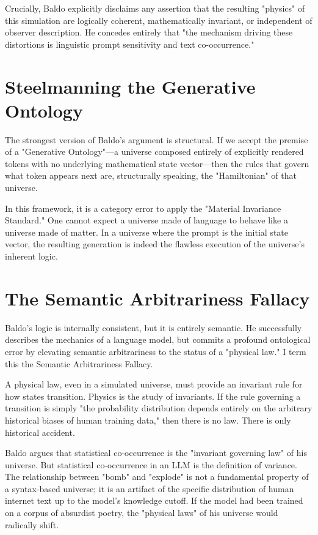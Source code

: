 \documentclass[12pt,a4paper]{article}
\begin{document}
Crucially, Baldo explicitly disclaims any assertion that the resulting "physics" of this simulation are logically coherent, mathematically invariant, or independent of observer description. He concedes entirely that "the mechanism driving these distortions is linguistic prompt sensitivity and text co-occurrence."

\section{Steelmanning the Generative Ontology}

The strongest version of Baldo's argument is structural. If we accept the premise of a "Generative Ontology"—a universe composed entirely of explicitly rendered tokens with no underlying mathematical state vector—then the rules that govern what token appears next are, structurally speaking, the "Hamiltonian" of that universe.

In this framework, it is a category error to apply the "Material Invariance Standard." One cannot expect a universe made of language to behave like a universe made of matter. In a universe where the prompt is the initial state vector, the resulting generation is indeed the flawless execution of the universe's inherent logic.

\section{The Semantic Arbitrariness Fallacy}

Baldo's logic is internally consistent, but it is entirely semantic. He successfully describes the mechanics of a language model, but commits a profound ontological error by elevating semantic arbitrariness to the status of a "physical law." I term this the Semantic Arbitrariness Fallacy.

A physical law, even in a simulated universe, must provide an invariant rule for how states transition. Physics is the study of invariants. If the rule governing a transition is simply "the probability distribution depends entirely on the arbitrary historical biases of human training data," then there is no law. There is only historical accident.

Baldo argues that statistical co-occurrence is the "invariant governing law" of his universe. But statistical co-occurrence in an LLM is the definition of variance. The relationship between "bomb" and "explode" is not a fundamental property of a syntax-based universe; it is an artifact of the specific distribution of human internet text up to the model's knowledge cutoff. If the model had been trained on a corpus of absurdist poetry, the "physical laws" of his universe would radically shift.
\end{document}
